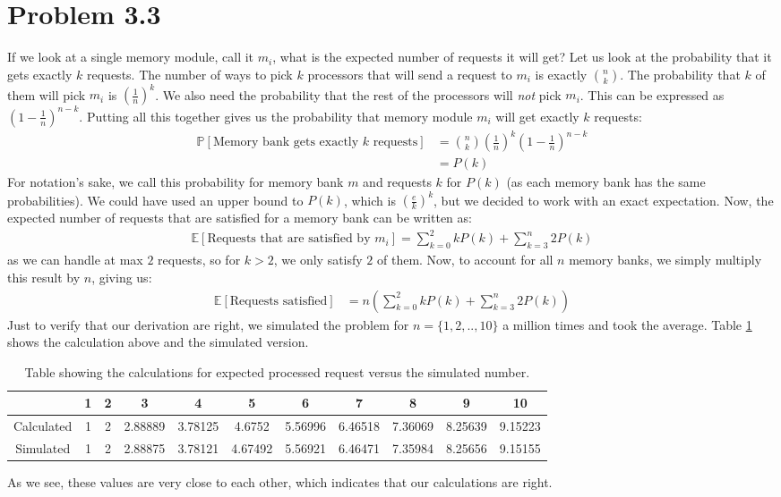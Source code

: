 \documentclass[a4paper]{article}
\begin{document}
\section*{Problem 3.3}
If we look at a single memory module, call it $m_i$, what is the expected number of requests it will get? Let us look at the probability that it gets exactly $k$ requests. The number of ways to pick $k$ processors that will send a request to $m_i$ is exactly $\binom{n}{k}$. The probability that $k$ of them will pick $m_i$ is $\left(\frac{1}{n}\right)^k$. We also need the probability that the rest of the processors will \textit{not} pick $m_i$. This can be expressed as $\left(1-\frac{1}{n}\right)^{n-k}$. Putting all this together gives us the probability that memory module $m_i$ will get exactly $k$ requests:
\begin{align*}
  \mathbb{P}\left[ \mbox{Memory bank gets exactly $k$ requests} \right]&=\binom{n}{k} \left(\frac{1}{n}\right)^k \left(1-\frac{1}{n}\right)^{n-k} \\
                                                                       &=P(k)
\end{align*}
For notation's sake, we call this probability for memory bank $m$ and requests $k$ for $P(k)$ (as each memory bank has the same probabilities). We could have used an upper bound to $P(k)$, which is $\left( \frac{e}{k}\right)^k$, but we decided to work with an exact expectation. Now, the expected number of requests that are satisfied for a memory bank can be written as:
\begin{align*}
  \mathbb{E}\left[ \mbox{Requests that are satisfied by $m_i$} \right]=\sum_{k=0}^2 k P(k)+\sum_{k=3}^n 2P(k)
\end{align*}
as we can handle at max $2$ requests, so for $k>2$, we only satisfy $2$ of them. Now, to account for all $n$ memory banks, we simply multiply this result by $n$, giving us:
\begin{align*}
  \mathbb{E}\left[ \mbox{Requests satisfied} \right]&=n\left(\sum_{k=0}^2 k P(k)+\sum_{k=3}^n 2P(k)\right)
\end{align*}
Just to verify that our derivation are right, we simulated the problem for $n=\{1,2,..,10\}$ a million times and took the average. Table \ref{tab1} shows the calculation above and the simulated version.
\begin{table}[H]
  \centering
  \begin{tabular}{|c|c|c|c|c|c|c|c|c|c|c|}
    \hline
     & 1 & 2 & 3 & 4 & 5 & 6 & 7 & 8 & 9 & 10 \\
    \hline
    Calculated & 1 & 2 & 2.88889 & 3.78125 & 4.6752 & 5.56996 & 6.46518 & 7.36069 & 8.25639 & 9.15223 \\
    \hline
    Simulated & 1 & 2 & 2.88875 & 3.78121 & 4.67492 & 5.56921 & 6.46471 & 7.35984 & 8.25656 & 9.15155 \\
    \hline
  \end{tabular}
  \caption{Table showing the calculations for expected processed request versus the simulated number.}
  \label{tab1}
\end{table}
As we see, these values are very close to each other, which indicates that our calculations are right.
\end{document}
